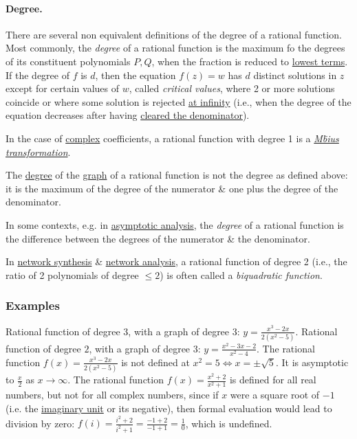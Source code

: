 \documentclass{article}
\begin{document}
\paragraph{Degree.} There are several non equivalent definitions of the degree of a rational function. Most commonly, the {\it degree} of a rational function is the maximum fo the degrees of its constituent polynomials $P,Q$, when the fraction is reduced to \href{https://en.wikipedia.org/wiki/Lowest_terms}{lowest terms}. If the degree of $f$ is $d$, then the equation $f(z) = w$ has $d$ distinct solutions in $z$ except for certain values of $w$, called {\it critical values}, where 2 or more solutions coincide or where some solution is rejected \href{https://en.wikipedia.org/wiki/Point_at_infinity}{at infinity} (i.e., when the degree of the equation decreases after having \href{https://en.wikipedia.org/wiki/Clearing_denominators}{cleared the denominator}).

In the case of \href{https://en.wikipedia.org/wiki/Complex_number}{complex} coefficients, a rational function with degree 1 is a \href{https://en.wikipedia.org/wiki/M%C3%B6bius_transformation}{\it M\"bius transformation}.

The \href{https://en.wikipedia.org/wiki/Degree_of_an_algebraic_variety}{degree} of the \href{https://en.wikipedia.org/wiki/Graph_of_a_function}{graph} of a rational function is not the degree as defined above: it is the maximum of the degree of the numerator \& one plus the degree of the denominator.

In some contexts, e.g. in \href{https://en.wikipedia.org/wiki/Asymptotic_analysis}{asymptotic analysis}, the {\it degree} of a rational function is the difference between the degrees of the numerator \& the denominator.

In \href{https://en.wikipedia.org/wiki/Network_synthesis}{network synthesis} \& \href{https://en.wikipedia.org/wiki/Network_analysis_(electrical_circuits)}{network analysis}, a rational function of degree 2 (i.e., the ratio of 2 polynomials of degree $\le2$) is often called a {\it biquadratic function}.

\subsubsection{Examples}
{\sf Rational function of degree $3$, with a graph of degree $3$: $y = \frac{x^3 - 2x}{2(x^2 - 5)}$. Rational function of degree $2$, with a graph of degree $3$: $y = \frac{x^2 - 3x - 2}{x^2 - 4}$.} The rational function $f(x) = \frac{x^3 - 2x}{2(x^2 - 5)}$ is not defined at $x^2 = 5\Leftrightarrow x = \pm\sqrt{5}$. It is asymptotic to $\frac{x}{2}$ as $x\to\infty$. The rational function $f(x) = \frac{x^2 + 2}{x^2 + 1}$ is defined for all real numbers, but not for all complex numbers, since if $x$ were a square root of $-1$ (i.e. the \href{https://en.wikipedia.org/wiki/Imaginary_unit}{imaginary unit} or its negative), then formal evaluation would lead to division by zero: $f(i) = \frac{i^2 + 2}{i^2 + 1} = \frac{-1 + 2}{-1 + 1} = \frac{1}{0}$, which is undefined.
\end{document}
